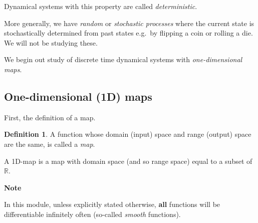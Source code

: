 \documentclass[
  a4paper,
  oneside,
  final]{krantz}
\newcommand{\R}{\mathbb{R}}
\theoremstyle{definition}
\newtheorem{definition}{Definition}[chapter]
\theoremstyle{definition}
\theoremstyle{definition}
\theoremstyle{definition}
\theoremstyle{remark}
\begin{document}
Dynamical systems with this property are called \emph{deterministic}.

More generally, we have \emph{random} or \emph{stochastic processes} where the current state is stochastically determined from past states e.g.~by flipping a coin or rolling a die. We will not be studying these.

We begin out study of discrete time dynamical systems with \emph{one-dimensional maps}.

\hypertarget{one-dimensional-1d-maps}{%
\subsection{One-dimensional (1D) maps}\label{one-dimensional-1d-maps}}

First, the definition of a map.

\begin{definition}
\protect\hypertarget{def:maps}{}\label{def:maps}A function whose domain (input) space and range (output) space are the same, is called a \emph{map}.

A 1D-map is a map with domain space (and so range space) equal to a subset of \(\R\).
\end{definition}

\begin{palegreenbox}

\begin{center}
\textbf{Note}

\end{center}

In this module, unless explicitly stated otherwise, \textbf{all} functions will be differentiable infinitely often (so-called \emph{smooth} functions).

\end{palegreenbox}
\end{document}
